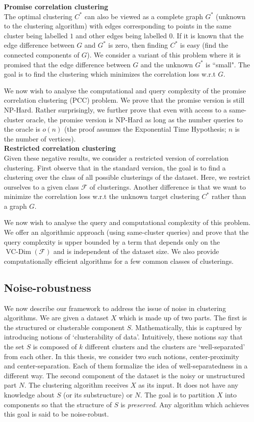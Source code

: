 \documentclass[12pt]{article}
\newcommand{\mc}{\mathcal}
\DeclareMathOperator{\vcdim}{VC-Dim}
\begin{document}
\noindent\textbf{\small Promise correlation clustering}\\
The optimal clustering $C^*$ can also be viewed as a complete graph $G^*$ (unknown to the clustering algorithm) with edges corresponding to points in the same cluster being labelled $1$ and other edges being labelled $0$. If it is known that the edge difference between $G$ and $G^*$ is zero, then finding $C^*$ is easy (find the connected components of $G$). We consider a variant of this problem where it is promised that the edge difference between $G$ and the unknown $G^*$ is ``small". The goal is to find the clustering which minimizes the correlation loss w.r.t $G$.

We now wish to analyse the computational and query complexity of the promise correlation clustering (PCC) problem. We prove that the promise version is still NP-Hard. Rather surprisingly, we further prove that even with access to a same-cluster oracle, the promise version is NP-Hard as long as the number queries to the oracle is $o(n)$ (the proof assumes the Exponential Time Hypothesis; $n$ is the number of vertices). \\

\noindent\textbf{\small Restricted correlation clustering}\\
Given these negative results, we consider a restricted version of correlation clustering. First observe that in the standard version, the goal is to find a clustering over the class of all possible clusterings of the dataset. Here, we restrict ourselves to a given class $\mc F$ of clusterings. Another difference is that we want to minimize the correlation loss w.r.t the unknown target clustering $C^*$ rather than a graph $G$. 

We now wish to analyse the query and computational complexity of this problem. We offer an algorithmic approach (using same-cluster queries) and prove that the query complexity is upper bounded by a term that depends only on the $\vcdim(\mc F)$ and is independent of the dataset size. We also provide computationally efficient algorithms for a few common classes of clusterings. 
 
\subsection{Noise-robustness}
We now describe our framework to address the issue of noise in clustering algorithms. We are given a dataset $X$ which is made up of two parts. The first is the structured or clusterable component $S$. Mathematically, this is captured by introducing notions of `clusterability of data'. Intuitively, these notions say that the set $S$ is composed of $k$ different clusters and the clusters are `well-separated' from each other. In this thesis, we consider two such notions, center-proximity and center-separation. Each of them formalize the idea of well-separatedness in a different way. The second component of the dataset is the noisy or unstructured part $N$. The clustering algorithm receives $X$ as its input. It does not have any knowledge about $S$ (or its substructure) or $N$. The goal is to partition $X$ into components so that the structure of $S$ is \textit{preserved}. Any algorithm which achieves this goal is said to be noise-robust. 
\end{document}
